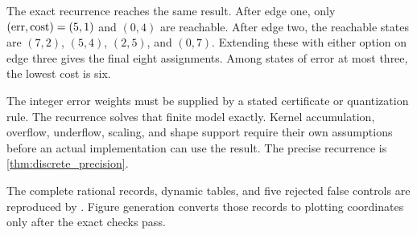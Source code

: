 The exact recurrence reaches the same result. After edge one, only $(\operatorname{err},\operatorname{cost})=(5,1)$ and $(0,4)$ are reachable. After edge two, the reachable states are $(7,2)$, $(5,4)$, $(2,5)$, and $(0,7)$. Extending these with either option on edge three gives the final eight assignments. Among states of error at most three, the lowest cost is six.

\begin{interpretation}[title={The certificate belongs to the model}]
The integer error weights must be supplied by a stated certificate or quantization rule. The recurrence solves that finite model exactly. Kernel accumulation, overflow, underflow, scaling, and shape support require their own assumptions before an actual implementation can use the result. The precise recurrence is \cref{thm:discrete_precision}.
\end{interpretation}
The complete rational records, dynamic tables, and five rejected false controls are reproduced by . Figure generation converts those records to plotting coordinates only after the exact checks pass.

\endgroup
